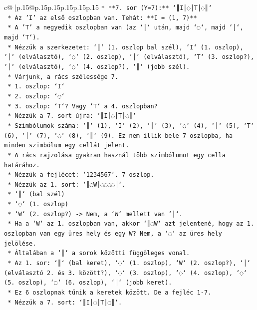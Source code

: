 \documentclass{article}
\begin{document}
{\begin{supertabular}{c@{$\;$}|p{.15\linewidth}@{}p{.15\linewidth}p{.15\linewidth}p{.15\linewidth}p{.15\linewidth}p{.15\linewidth}}
{{{\texttt{*   **7. sor (Y=7):** `║I│◌│T│◌║`} \\
\texttt{    *   Az 'I' az első oszlopban van. Tehát: **I = (1, 7)**} \\
\texttt{    *   A 'T' a negyedik oszlopban van (az `│` után, majd `◌`, majd `│`, majd `T`).} \\
\texttt{    *   Nézzük a szerkezetet: `║` (1. oszlop bal szél), `I` (1. oszlop), `│` (elválasztó), `◌` (2. oszlop), `│` (elválasztó), `T` (3. oszlop?), `│` (elválasztó), `◌` (4. oszlop?), `║` (jobb szél).} \\
\texttt{    *   Várjunk, a rács szélessége 7.} \\
\texttt{    *   1. oszlop: `I`} \\
\texttt{    *   2. oszlop: `◌`} \\
\texttt{    *   3. oszlop: `T`? Vagy `T` a 4. oszlopban?} \\
\texttt{    *   Nézzük a 7. sort újra: `║I│◌│T│◌║`} \\
\texttt{    *   Szimbólumok száma: `║` (1), `I` (2), `│` (3), `◌` (4), `│` (5), `T` (6), `│` (7), `◌` (8), `║` (9). Ez nem illik bele 7 oszlopba, ha minden szimbólum egy cellát jelent.} \\
\texttt{    *   A rács rajzolása gyakran használ több szimbólumot egy cella határához.} \\
\texttt{    *   Nézzük a fejlécet: `1234567`. 7 oszlop.} \\
\texttt{    *   Nézzük az 1. sort: `║◌W│◌◌◌◌║`.} \\
\texttt{        *   `║` (bal szél)} \\
\texttt{        *   `◌` (1. oszlop)} \\
\texttt{        *   `W` (2. oszlop?) {-}> Nem, a `W` mellett van `│`.} \\
\texttt{        *   Ha a `W` az 1. oszlopban van, akkor `║◌W` azt jelentené, hogy az 1. oszlopban van egy üres hely és egy W? Nem, a `◌` az üres hely jelölése.} \\
\texttt{        *   Általában a `║` a sorok közötti függőleges vonal.} \\
\texttt{        *   Az 1. sor: `║` (bal keret), `◌` (1. oszlop), `W` (2. oszlop?), `│` (elválasztó 2. és 3. között?), `◌` (3. oszlop), `◌` (4. oszlop), `◌` (5. oszlop), `◌` (6. oszlop), `║` (jobb keret).} \\
\texttt{        *   Ez 6 oszlopnak tűnik a keretek között. De a fejléc 1{-}7.} \\
\texttt{        *   Nézzük a 7. sort: `║I│◌│T│◌║`.} \\
}}}
\end{supertabular}}
\end{document}
